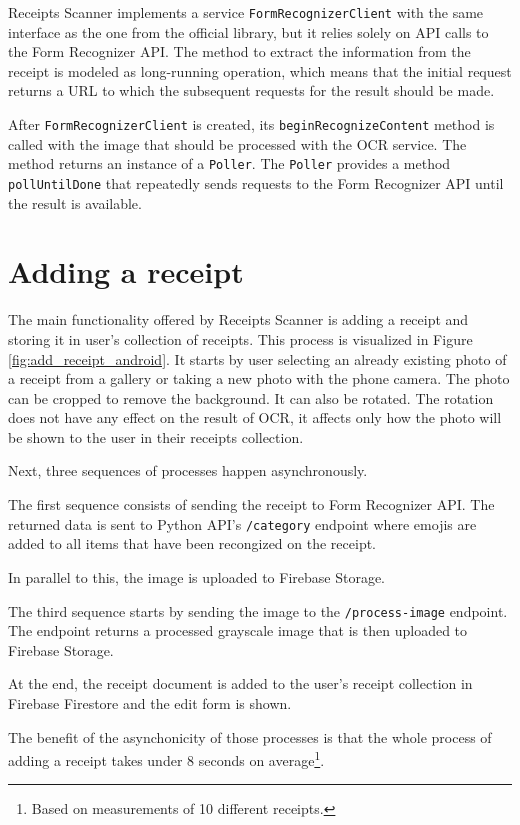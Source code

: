 \documentclass[
  digital, %
  table,   %
  oneside, %
  lof,     %
  lot,     %
]{fithesis3}
\begin{document}
Receipts Scanner implements a service \texttt{FormRecognizerClient} with the same interface as the one from the official library, but it relies solely on API calls to the Form Recognizer API. The method to extract the information from the receipt is modeled as long-running operation, which means that the initial request returns a URL to which the subsequent requests for the result should be made.

After \texttt{FormRecognizerClient} is created, its \texttt{beginRecognizeContent} method is called with the image that should be processed with the OCR service. The method returns an instance of a \texttt{Poller}. The \texttt{Poller} provides a method \texttt{pollUntilDone} that repeatedly sends requests to the Form Recognizer API until the result is available.

\chapter{Adding a receipt}
The main functionality offered by Receipts Scanner is adding a receipt and storing it in user's collection of receipts.
This process is visualized in Figure \ref{fig:add_receipt_android}.
It starts by user selecting an already existing photo of a receipt from a gallery or taking a new photo with the phone camera. The photo can be cropped to remove the background. It can also be rotated. The rotation does not have any effect on the result of OCR, it affects only how the photo will be shown to the user in their receipts collection.

Next, three sequences of processes happen asynchronously.

The first sequence consists of sending the receipt to Form Recognizer API. The returned data is sent to Python API's \texttt{/category} endpoint where emojis are added to all items that have been recongized on the receipt.

In parallel to this, the image is uploaded to Firebase Storage.

The third sequence starts by sending the image to the \texttt{/process-image} endpoint. The endpoint returns a processed grayscale image that is then uploaded to Firebase Storage.

At the end, the receipt document is added to the user's receipt collection in Firebase Firestore and the edit form is shown. 

The benefit of the asynchonicity of those processes is that the whole process of adding a receipt takes under 8 seconds on average\footnote{Based on measurements of 10 different receipts.}.
\end{document}

